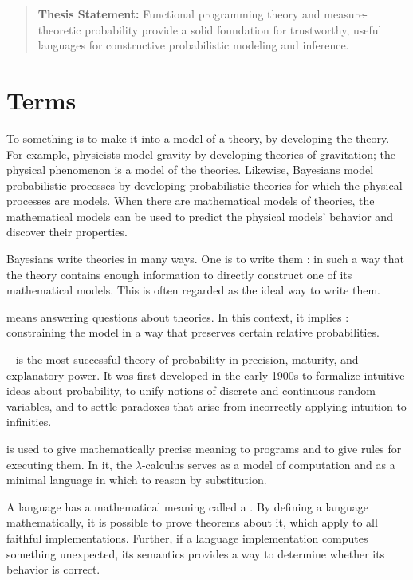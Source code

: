 \begin{quote}
\textbf{Thesis Statement:} Functional programming theory and measure-theoretic probability provide a solid foundation for trustworthy, useful languages for constructive probabilistic modeling and inference.
\end{quote}

\section{Terms}

To  something is to make it into a model of a theory, by developing the theory. For example, physicists model gravity by developing theories of gravitation; the physical phenomenon is a model of the theories. Likewise, Bayesians model probabilistic processes by developing probabilistic theories for which the physical processes are models.
When there are mathematical models of theories, the mathematical models can be used to predict the physical models' behavior and discover their properties.

Bayesians write theories in many ways. One is to write them : in such a way that the theory contains enough information to directly construct one of its mathematical models. This is often regarded as the ideal way to write them.

 means answering questions about theories.
In this context, it implies : constraining the model in a way that preserves certain relative probabilities.

~\cite{cit:klenke-2006-probability} is the most successful theory of probability in precision, maturity, and explanatory power. It was first developed in the early 1900s to formalize intuitive ideas about probability, to unify notions of discrete and continuous random variables, and to settle paradoxes that arise from incorrectly applying intuition to infinities.

 is used to give mathematically precise meaning to programs and to give rules for executing them. In it, the $\lambda$-calculus serves as a model of computation and as a minimal language in which to reason by substitution.

A  language has a mathematical meaning called a .
By defining a language mathematically, it is possible to prove theorems about it, which apply to all faithful implementations.
Further, if a language implementation computes something unexpected, its semantics provides a way to determine whether its behavior is correct.

